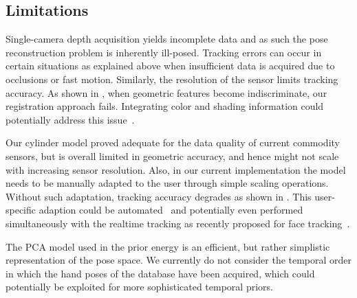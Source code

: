 



\subsection*{Limitations}


Single-camera depth acquisition yields incomplete data and as such the pose reconstruction problem is inherently ill-posed.
Tracking errors can occur in certain situations as explained above when insufficient data is acquired due to occlusions or fast motion.
Similarly, the resolution of the sensor limits tracking accuracy. As shown in , when geometric features become indiscriminate, our registration approach fails. Integrating color and shading information could potentially address this issue~\cite{delagorce2011model}.

Our cylinder model proved adequate for the data quality of current commodity sensors, but is overall limited in geometric accuracy, and hence might not scale with increasing sensor resolution.
Also, in our current implementation the model needs to be manually adapted to the user through simple scaling operations. Without such adaptation, tracking accuracy degrades as shown in .
This user-specific adaption could be automated~\cite{taylor2014user} and potentially even performed simultaneously with the realtime tracking as recently proposed for face tracking~\cite{bouaziz2013online}.

The PCA model used in the prior energy is an efficient, but rather simplistic representation of the pose space. We currently do not consider the
temporal order in which the hand poses of the database have been acquired, which could potentially be exploited for more sophisticated temporal priors. 


